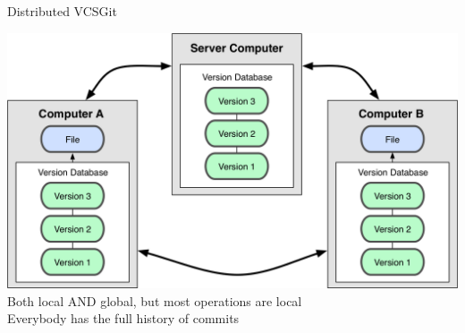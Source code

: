 \documentclass[10pt,xcolor=dvipsnames]{beamer}
\begin{document}
\begin{frame}{Distributed VCS}{Git}

\begin{center}
\centering
\includegraphics [scale=0.3]{VCS_distributed.png}\\[0.2in]
Both local AND global, but most operations are local\\
 Everybody has the full history of commits
\end{center}
\end{frame}
\end{document}
